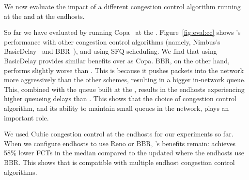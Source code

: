 We now evaluate the impact of a different congestion control algorithm running at the \inbox and at the endhosts.



 So far we have evaluated \name by running Copa~\cite{copa} at the \inbox. 
Figure~\ref{fig:eval:cc} shows \name's performance with other congestion control algorithms (namely, Nimbus's BasicDelay~\cite{nimbus-arxiv} and BBR~\cite{bbr}), and using SFQ scheduling. 
We find that using BasicDelay provides similar benefits over \baseline as Copa. 
BBR, on the other hand, performs slightly worse than \baseline. 
This is because it pushes packets into the network more aggressively than the other schemes, resulting in a bigger in-network queue.
This, combined with the queue built at the \name, results in the endhosts experiencing higher queueing delays than \baseline. This shows that the choice of congestion control algorithm, and its ability to maintain small queues in the network, plays an important role. 

 We used Cubic congestion control at the endhosts for our experiments so far. When we configure endhosts to use Reno or BBR, \name's benefits remain: \name achieves 58\% lower FCTs in the median compared to the updated \baseline where the endhosts use BBR. 
This shows that \name is compatible with multiple endhost congestion control algorithms.

